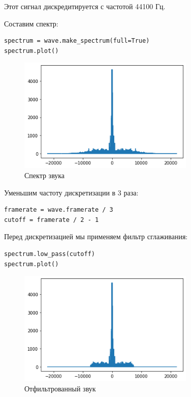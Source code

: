 \documentclass[a4paper,12pt]{report}
\begin{document}
Этот сигнал дискредитируется с частотой 44100 Гц.

Составим спектр:

\begin{lstlisting}[caption=Спектр звука]
spectrum = wave.make_spectrum(full=True)
spectrum.plot()
\end{lstlisting}

\begin{figure}[H]
        \centering
        \includegraphics[width=0.75\textwidth]{2.png}
        \caption{Спектр звука}
        \label{2}
\end{figure}

Уменьшим частоту дискретизации в 3 раза:

\begin{lstlisting}[caption=Уменьшение частоты дискретизации]
framerate = wave.framerate / 3
cutoff = framerate / 2 - 1
\end{lstlisting}

Перед дискретизацией мы применяем фильтр сглаживания:

\begin{lstlisting}[caption=Отфильтрованный звук]
spectrum.low_pass(cutoff)
spectrum.plot()
\end{lstlisting}

\begin{figure}[H]
        \centering
        \includegraphics[width=0.75\textwidth]{3.png}
        \caption{Отфильтрованный звук}
        \label{3}
\end{figure}
\end{document}
